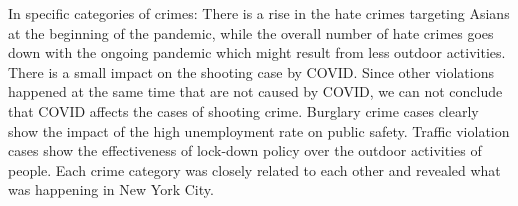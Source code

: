 \documentclass[conference]{IEEEtran}
\begin{document}
In specific categories of crimes:
There is a rise in the hate crimes targeting Asians at the beginning of the pandemic, while the overall number of hate crimes goes down with the ongoing pandemic which might result from less outdoor activities.
There is a small impact on the shooting case by COVID. Since other violations happened at the same time that are not caused by COVID, we can not conclude that COVID affects the cases of shooting crime.
Burglary crime cases clearly show the impact of the high unemployment rate on public safety. Traffic violation cases show the effectiveness of lock-down policy over the outdoor activities of people. Each crime category was closely related to each other and revealed what was happening in New York City.



\end{document}

